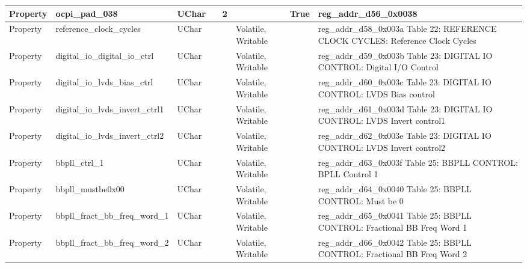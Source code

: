 \documentclass{article}
\begin{document}
\begin{scriptsize}
\begin{longtable}{|p{2cm}|p{5cm}|p{1cm}|p{2cm}|p{2cm}|p{1.75cm}|p{1.5cm}|p{5.1cm}|}
  \hline
  Property & ocpi\_pad\_038                                           & UChar &                  & 2                &                     & True    & reg\_addr\_d56\_0x0038 \\
  \hline
  Property & reference\_clock\_cycles                                 & UChar &                  &                  & Volatile,  Writable &         & reg\_addr\_d58\_0x003a  Table 22: REFERENCE CLOCK CYCLES: Reference Clock Cycles \\
  \hline
  Property & digital\_io\_digital\_io\_ctrl                           & UChar &                  &                  & Volatile,  Writable &         & reg\_addr\_d59\_0x003b  Table 23: DIGITAL IO CONTROL: Digital I/O Control \\
  \hline
  Property & digital\_io\_lvds\_bias\_ctrl                            & UChar &                  &                  & Volatile,  Writable &         & reg\_addr\_d60\_0x003c  Table 23: DIGITAL IO CONTROL: LVDS Bias control \\
  \hline
  Property & digital\_io\_lvds\_invert\_ctrl1                         & UChar &                  &                  & Volatile,  Writable &         & reg\_addr\_d61\_0x003d  Table 23: DIGITAL IO CONTROL: LVDS Invert control1 \\
  \hline
  Property & digital\_io\_lvds\_invert\_ctrl2                         & UChar &                  &                  & Volatile,  Writable &         & reg\_addr\_d62\_0x003e  Table 23: DIGITAL IO CONTROL: LVDS Invert control2 \\
  \hline
  Property & bbpll\_ctrl\_1                                           & UChar &                  &                  & Volatile,  Writable &         & reg\_addr\_d63\_0x003f  Table 25: BBPLL CONTROL: BPLL Control 1 \\
  \hline
  Property & bbpll\_mustbe0x00                                        & UChar &                  &                  & Volatile,  Writable &         & reg\_addr\_d64\_0x0040  Table 25: BBPLL CONTROL: Must be 0 \\
  \hline
  Property & bbpll\_fract\_bb\_freq\_word\_1                          & UChar &                  &                  & Volatile,  Writable &         & reg\_addr\_d65\_0x0041  Table 25: BBPLL CONTROL: Fractional BB Freq Word 1 \\
  \hline
  Property & bbpll\_fract\_bb\_freq\_word\_2                          & UChar &                  &                  & Volatile,  Writable &         & reg\_addr\_d66\_0x0042  Table 25: BBPLL CONTROL: Fractional BB Freq Word 2 \\

\end{longtable}
\end{scriptsize}
\end{document}

